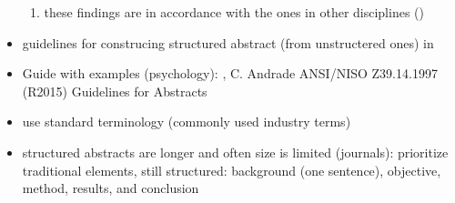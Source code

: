 \begin{itemize}
\begin{enumerate}
	\item these findings are in accordance with the ones in other disciplines ()
	\end{enumerate}
\item guidelines for construcing structured abstract (from unstructered ones) in \cite{KBO2008}
\item Guide with examples (psychology): , C. Andrade
	\newline
	ANSI/NISO Z39.14.1997 (R2015) Guidelines for Abstracts
\item use standard terminology (commonly used industry terms) \cite{Jedlitschka2008}
\item structured abstracts are longer and often size is limited (journals): prioritize traditional elements, still structured: background (one sentence), objective, method, results, and conclusion \cite{Jedlitschka2008}
\end{itemize}